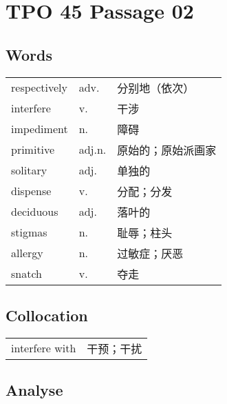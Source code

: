 \section{TPO 45 Passage 02}

\subsection{Words}

\begin{tabular}{lll}
    respectively & adv.   & 分别地（依次）   \\
    interfere    & v.     & 干涉        \\
    impediment   & n.     & 障碍        \\
    primitive    & adj.n. & 原始的；原始派画家 \\
    solitary     & adj.   & 单独的       \\
    dispense     & v.     & 分配；分发     \\
    deciduous    & adj.   & 落叶的       \\
    stigmas      & n.     & 耻辱；柱头     \\
    allergy      & n.     & 过敏症；厌恶    \\
    snatch       & v.     & 夺走        \\
\end{tabular}

\subsection{Collocation}

\begin{tabular}{ll}
    interfere with & 干预；干扰 \\
\end{tabular}

\subsection{Analyse}

